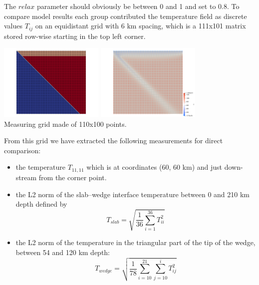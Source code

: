 The $relax$ parameter should obviously be between 0 and 1 and set to 0.8. 
To compare model results each
group contributed the temperature field as discrete values $T_{ij}$ on
an equidistant grid with 6 km spacing, which is a 111x101 matrix
stored row-wise starting in the top left corner. 

\begin{center}
\includegraphics[width=5cm]{python_codes/fieldstone_68/images/grid1}
\includegraphics[width=5cm]{python_codes/fieldstone_68/images/grid2}\\
{\captionfont Measuring grid made of 110x100 points.}
\end{center}

From this grid we have extracted the following measurements for direct comparison:
\begin{itemize}
\item the temperature $T_{11,11}$ which is at coordinates (60, 60 km) and
just down-stream from the corner point.
\item the L2 norm of the slab–wedge interface temperature between
0 and 210 km depth defined by
\[
T_{slab} = \sqrt{\frac{1}{36} \sum_{i=1}^{36} T_{ii}^2  }
\]
\item 
the L2 norm of the temperature in the triangular part of the
tip of the wedge, between 54 and 120 km depth:
\[
T_{wedge} = \sqrt{ \frac{1}{78} \sum_{i=10}^{21} \sum_{j=10}^i T_{ij}^2   }
\]
\end{itemize}

